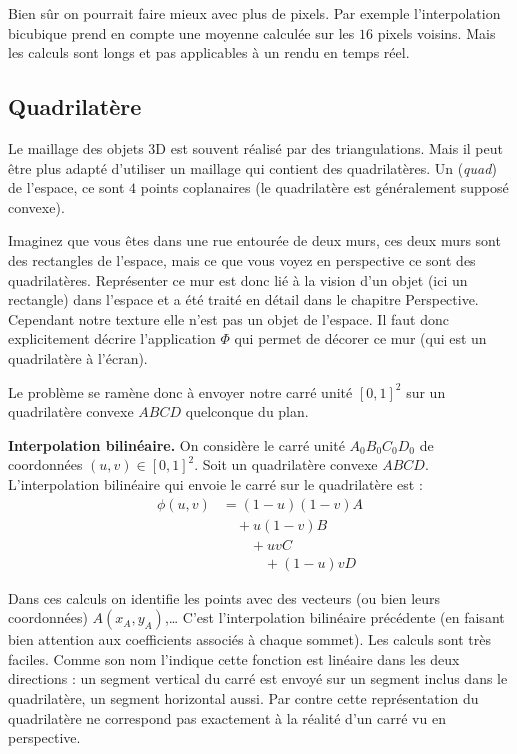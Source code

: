\documentclass[11pt,class=report,crop=false]{standalone}
\begin{document}
Bien sûr on pourrait faire mieux avec plus de pixels. Par exemple l'interpolation bicubique prend en compte une moyenne calculée sur les $16$ pixels voisins. Mais les calculs sont longs et pas applicables à un rendu en temps réel.


\subsection{Quadrilatère}

Le maillage des objets 3D est souvent réalisé par des triangulations. 
Mais il peut être plus adapté d'utiliser un maillage qui contient des quadrilatères.
Un  (\emph{quad}) de l'espace, ce sont $4$ points coplanaires (le quadrilatère est généralement supposé convexe).


Imaginez que vous êtes dans une rue entourée de deux murs, ces deux murs sont des rectangles de l'espace, mais ce que vous voyez en perspective ce sont des quadrilatères.
Représenter ce mur est donc lié à la vision d'un objet (ici un rectangle) dans l'espace et a été traité en détail dans le chapitre \og{}Perspective\fg{}. Cependant notre texture elle n'est pas un objet de l'espace. Il faut donc explicitement décrire l'application $\Phi$ qui permet de décorer ce mur (qui est un quadrilatère à l'écran).

Le problème se ramène donc à envoyer notre carré unité $[0,1]^2$ sur un quadrilatère convexe $ABCD$ quelconque du plan.


\medskip
\textbf{Interpolation bilinéaire.}
On considère le carré unité $A_0B_0C_0D_0$ de coordonnées $(u,v) \in [0,1]^2$.
Soit un quadrilatère convexe $ABCD$. L'interpolation bilinéaire qui envoie 
le carré sur le quadrilatère est :
\begin{align*}
\phi(u,v)  
& = (1-u)(1-v) A  \\
& \quad +  u(1-v) B \\
& \quad\quad +   uv C \\
& \quad\quad\quad +  (1-u)v D
\end{align*}


Dans ces calculs on identifie les points avec des vecteurs (ou bien leurs coordonnées) $A(x_A,y_A)$,\ldots{}
C'est l'interpolation bilinéaire précédente (en faisant bien attention aux coefficients associés à chaque sommet). Les calculs sont très faciles. Comme son nom l'indique cette fonction est linéaire dans les deux directions : un segment vertical du carré est envoyé sur un segment inclus dans le quadrilatère, un segment horizontal aussi. Par contre cette représentation du quadrilatère ne correspond pas exactement à la réalité d'un carré vu en perspective.
\end{document}

